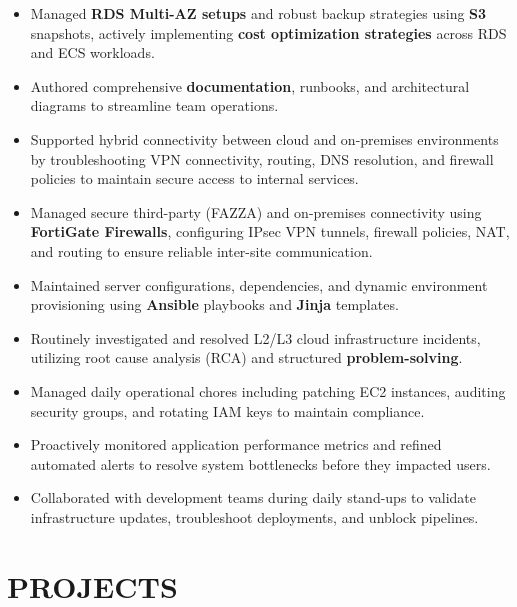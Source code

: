 \documentclass[10pt,a4paper]{article}
\begin{document}
\begin{itemize}[leftmargin=*,itemsep=1pt,parsep=0pt]
\item Managed \textbf{RDS Multi-AZ setups} and robust backup strategies using \textbf{S3} snapshots, actively implementing \textbf{cost optimization strategies} across RDS and ECS workloads.
\item Authored comprehensive \textbf{documentation}, runbooks, and architectural diagrams to streamline team operations.
\item Supported hybrid connectivity between cloud and on-premises environments by troubleshooting VPN connectivity, routing, DNS resolution, and firewall policies to maintain secure access to internal services.
\item Managed secure third-party (FAZZA) and on-premises connectivity using \textbf{FortiGate Firewalls}, configuring IPsec VPN tunnels, firewall policies, NAT, and routing to ensure reliable inter-site communication.
\item Maintained server configurations, dependencies, and dynamic environment provisioning using \textbf{Ansible} playbooks and \textbf{Jinja} templates.
\item Routinely investigated and resolved L2/L3 cloud infrastructure incidents, utilizing root cause analysis (RCA) and structured \textbf{problem-solving}.
\item Managed daily operational chores including patching EC2 instances, auditing security groups, and rotating IAM keys to maintain compliance.
\item Proactively monitored application performance metrics and refined automated alerts to resolve system bottlenecks before they impacted users.
\item Collaborated with development teams during daily stand-ups to validate infrastructure updates, troubleshoot deployments, and unblock pipelines.
\end{itemize}


\section*{PROJECTS}
\end{document}
